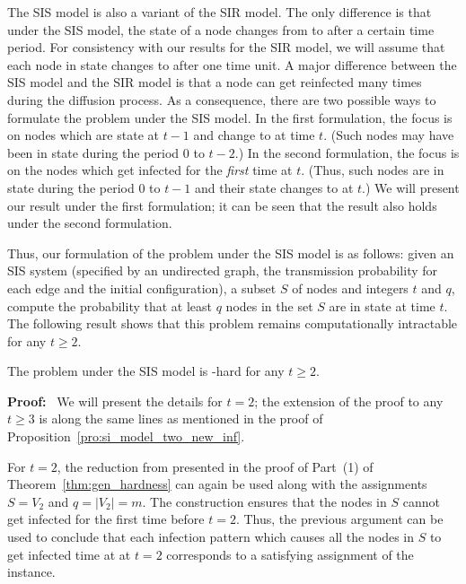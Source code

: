 The SIS model \cite{Easley_Kleinberg-2010} is also a variant 
of the SIR model.
The only difference is that under the SIS model,
the state of a node changes from \istate{} to \sstate{}
after a certain time period.
For consistency with our results for the SIR model,
we will assume that each node in state \istate{} changes
to \sstate{} after one time unit.
A major difference between the SIS model and the SIR model
is that a node can get reinfected many times during the 
diffusion process. 
As a consequence, there are two possible ways to formulate the \tNewInfs{}
problem under the SIS model.
In the first formulation, the focus is on nodes which are state \sstate{} 
at $t-1$ and change to \istate{} at time $t$. 
(Such nodes may have been in state \istate{} during the period
0 to $t-2$.)
In the second formulation, the focus is on the nodes which
get infected for the \emph{first} time at $t$.
(Thus, such nodes are in state \sstate{} during the period 0 to $t-1$
and their state changes to \istate{} at $t$.)
We will present our result under the first formulation; it
can be seen that the result also holds under the second formulation.

Thus, our formulation of the \tNewInfs{} problem under the SIS
model is as follows:
given an SIS system (specified by an undirected graph, 
the transmission probability for
each edge and the initial configuration), a subset $S$ of nodes
and integers $t$ and $q$, compute the probability that 
at least $q$ nodes in the set $S$ are in state \istate{} 
at time $t$.
The following result shows that this problem remains computationally
intractable for any $t \geq 2$.

\begin{proposition}\label{pro:sis_model_two_new_inf}
The \tNewInfs{} problem under the SIS model is \cnump-hard 
for any $t \geq 2$.
\end{proposition}

\smallskip
\noindent
\textbf{Proof:}~ We will present the details for $t = 2$; 
the extension of the proof to any $t \geq 3$ is along the same lines
as mentioned in the proof of Proposition~\ref{pro:si_model_two_new_inf}.

For $t = 2$, the reduction from \mtsat{} 
presented in the proof of Part~(1) of Theorem~\ref{thm:gen_hardness}
can again be used along with the assignments 
$S = V_2$ and $q = |V_2| = m$. 
The construction ensures that the nodes in $S$ cannot get 
infected for the first time before $t = 2$. 
Thus, the previous argument
can be used to conclude that 
each infection pattern which causes all
the nodes in $S$ to get infected time at
at $t = 2$ corresponds to a
satisfying assignment of the \mtsat{} instance. 
\QED

